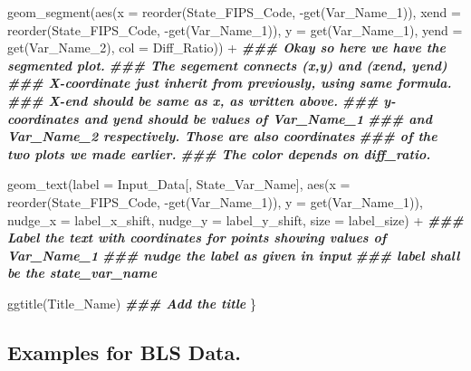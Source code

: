 \documentclass[
]{article}
\newenvironment{Shaded}{\begin{snugshade}}{\end{snugshade}}
\newcommand{\AttributeTok}[1]{\textcolor[rgb]{0.77,0.63,0.00}{#1}}
\newcommand{\DocumentationTok}[1]{\textcolor[rgb]{0.56,0.35,0.01}{\textbf{\textit{#1}}}}
\newcommand{\FunctionTok}[1]{\textcolor[rgb]{0.00,0.00,0.00}{#1}}
\newcommand{\NormalTok}[1]{#1}
\newcommand{\SpecialCharTok}[1]{\textcolor[rgb]{0.00,0.00,0.00}{#1}}
\begin{document}
\begin{Shaded}
\begin{Highlighting}[]
  \FunctionTok{geom\_segment}\NormalTok{(}\FunctionTok{aes}\NormalTok{(}\AttributeTok{x =} \FunctionTok{reorder}\NormalTok{(State\_FIPS\_Code, }\SpecialCharTok{{-}}\FunctionTok{get}\NormalTok{(Var\_Name\_1)), }
                     \AttributeTok{xend =} \FunctionTok{reorder}\NormalTok{(State\_FIPS\_Code, }\SpecialCharTok{{-}}\FunctionTok{get}\NormalTok{(Var\_Name\_1)),}
                     \AttributeTok{y =} \FunctionTok{get}\NormalTok{(Var\_Name\_1), }\AttributeTok{yend =} \FunctionTok{get}\NormalTok{(Var\_Name\_2),}
                     \AttributeTok{col =}\NormalTok{ Diff\_Ratio)) }\SpecialCharTok{+}
    \DocumentationTok{\#\#\# Okay so here we have the segmented plot.}
    \DocumentationTok{\#\#\# The segement connects (x,y) and (xend, yend)}
    \DocumentationTok{\#\#\# X{-}coordinate just inherit from previously, using same formula.}
    \DocumentationTok{\#\#\# X{-}end should be same as x, as written above.}
    \DocumentationTok{\#\#\# y{-}coordinates and yend should be values of Var\_Name\_1}
    \DocumentationTok{\#\#\# and Var\_Name\_2 respectively. Those are also coordinates}
    \DocumentationTok{\#\#\# of the two plots we made earlier.}
    \DocumentationTok{\#\#\# The color depends on diff\_ratio.}
    
  \FunctionTok{geom\_text}\NormalTok{(}\AttributeTok{label =}\NormalTok{ Input\_Data[, State\_Var\_Name], }
            \FunctionTok{aes}\NormalTok{(}\AttributeTok{x =} \FunctionTok{reorder}\NormalTok{(State\_FIPS\_Code, }\SpecialCharTok{{-}}\FunctionTok{get}\NormalTok{(Var\_Name\_1)), }
                            \AttributeTok{y =} \FunctionTok{get}\NormalTok{(Var\_Name\_1)),}
            \AttributeTok{nudge\_x =}\NormalTok{ label\_x\_shift, }
            \AttributeTok{nudge\_y =}\NormalTok{ label\_y\_shift,}
            \AttributeTok{size =}\NormalTok{ label\_size) }\SpecialCharTok{+}
    \DocumentationTok{\#\#\# Label the text with coordinates for points showing values of Var\_Name\_1}
    \DocumentationTok{\#\#\# nudge the label as given in input}
    \DocumentationTok{\#\#\# label shall be the state\_var\_name}
    
  \FunctionTok{ggtitle}\NormalTok{(Title\_Name)}
  \DocumentationTok{\#\#\# Add the title}
\NormalTok{\}}
\end{Highlighting}
\end{Shaded}

\hypertarget{examples-for-bls-data.}{%
\subsection{Examples for BLS Data.}\label{examples-for-bls-data.}}
\end{document}
